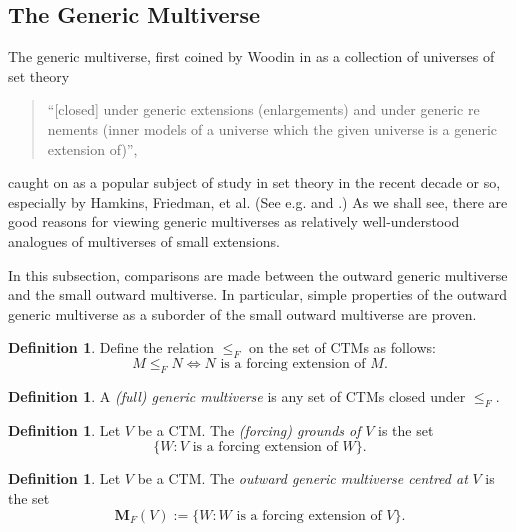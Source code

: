 \documentclass[12pt, twoside]{memoir}
\numberwithin{equation}{section}
\theoremstyle{definition}
\newtheorem{defi}[thm]{Definition}
\theoremstyle{remark}
\theoremstyle{definition}
\theoremstyle{definition}
\theoremstyle{definition}
\theoremstyle{remark}
\begin{document}
\subsection{The Generic Multiverse}\label{genmul}

The generic multiverse, first coined by Woodin in \cite{woodingen} as a collection of universes of set theory 
\begin{quote}
    ``[closed] under generic extensions (enlargements) and under generic re nements (inner models of a universe which the given universe is a generic extension of)'',
\end{quote}
caught on as a popular subject of study in set theory in the recent decade or so, especially by Hamkins, Friedman, et al. (See e.g. \cite{hamkinsmoving} and \cite{sygeneric}.) As we shall see, there are good reasons for viewing generic multiverses as relatively well-understood analogues of multiverses of small extensions.

In this subsection, comparisons are made between the outward generic multiverse and the small outward multiverse. In particular, simple properties of the outward generic multiverse as a suborder of the small outward multiverse are proven.

\begin{defi}
Define the relation $\leq_F$ on the set of CTMs as follows:
\begin{equation*}
    M \leq_F N \iff N \text{ is a forcing extension of } M \text{.}
\end{equation*}
\end{defi}

\begin{defi}
A \emph{(full) generic multiverse} is any set of CTMs closed under $\leq_F$.
\end{defi}

\begin{defi}
Let $V$ be a CTM. The \emph{(forcing) grounds of} $V$ is the set
\begin{equation*}
    \{W : V \text{ is a forcing extension of } W\} \text{.}
\end{equation*}
\end{defi}

\begin{defi}\label{def9116}
Let $V$ be a CTM. The \emph{outward generic multiverse centred at} $V$ is the set
\begin{equation*}
    \mathbf{M}_F(V) := \{W : W \text{ is a forcing extension of } V\} \text{.}
\end{equation*}
\end{defi} 
\end{document}
